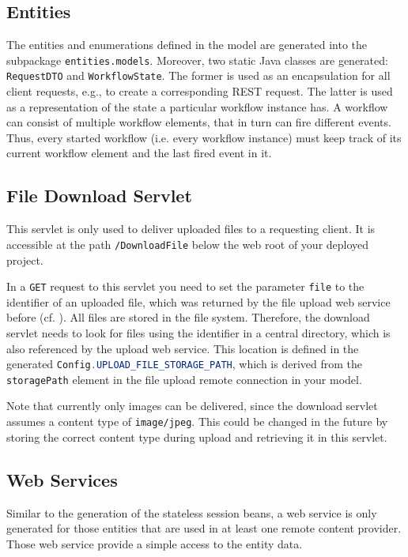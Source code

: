 \subsection{Entities}
The entities and enumerations defined in the \MD model are generated into the subpackage \lstinline|entities.models|. Moreover, two static Java classes are generated:  \lstinline|RequestDTO| and \lstinline|WorkflowState|. The former is used as an encapsulation for all client requests, e.g., to create a corresponding REST request. The latter is used as a representation of the state a particular workflow instance has. A workflow can consist of multiple workflow elements, that in turn can fire different events. Thus, every started workflow (i.e. every workflow instance) must keep track of its current workflow element and the last fired event in it.

\subsection{File Download Servlet}
This servlet is only used to deliver uploaded files to a requesting client. It is accessible at the path \lstinline|/DownloadFile| below the web root of your deployed project. 

In a \lstinline[language=Simple]|GET| request to this servlet you need to set the parameter \lstinline|file| to the identifier of an uploaded file, which was returned by the file upload web service before (cf. ). 
All files are stored in the file system. Therefore, the download servlet needs to look for files using the identifier in a central directory, which is also referenced by the upload web service. This location  is defined in the generated \lstinline[language=Java]|Config.UPLOAD_FILE_STORAGE_PATH|, which is derived from the \lstinline|storagePath| element in the file upload remote connection in your model.

Note that currently only images can be delivered, since the download servlet assumes a content type of \lstinline|image/jpeg|. This could be changed in the future by storing the correct content type during upload and retrieving it in this servlet.

\subsection{Web Services}
Similar to the generation of the stateless session beans, a web service is only generated for those entities that are used in at least one remote content provider. Those web service provide a simple access to the entity data.

